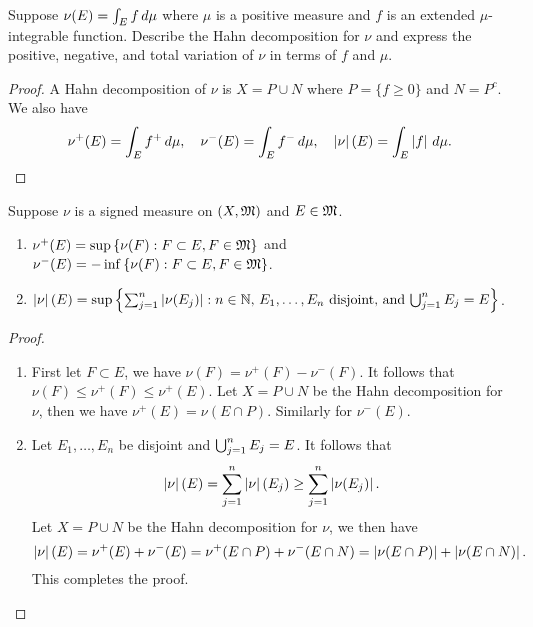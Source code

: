 \documentclass[a4paper]{article}
\begin{document}
\begin{ex}[Folland 3.6]
Suppose $\nu(E) = \int_E f \, d \mu$ where $\mu$ is a positive 
measure and $f$ is an extended $\mu$-integrable function. 
Describe the Hahn decomposition for $\nu$ and express 
the positive, negative, and total variation of $\nu$ 
in terms of $f$ and $\mu$. 
\end{ex}

\begin{proof}
A Hahn decomposition of $\nu$ is $X = P \cup N$ where 
$P = \{f \geq 0\}$ and $N = P^c$. We also have 
\[
\begin{aligned}
  \nu^+ (E) = \int_E f^+ \, d \mu, \quad
  \nu^- (E) = \int_E f^- \, d \mu, \quad
  \left\lvert \nu\right\rvert (E) = \int_E \left\lvert f\right\rvert \, d \mu.
\end{aligned}
\]
\end{proof}

\begin{ex}[Folland 3.7]
Suppose $\nu$ is a signed measure on $(X, \mathfrak{M})$ and $E \in \mathfrak{M}$.
\begin{enumerate}
\item $\nu^+ (E) = \sup \left\{ \nu(F) : F \subset E, F \in \mathfrak{M} 
\right\}$ and $\nu^-(E) = - \inf \left\{ \nu(F) : F \subset E, 
F \in \mathfrak{M} \right\}$. 

\item $\left\lvert \nu\right\rvert(E) = \sup \left\{ \sum_{j=1}^n \left\lvert \nu(E_j)\right\rvert 
: \text{$n \in \mathbb{N}$, $E_1, \dots, E_n$ disjoint, and 
$\bigcup_{j=1}^n E_j = E$} \right\}$.
\end{enumerate}
\end{ex}

\begin{proof}
\begin{enumerate}
\item First let $F \subset E$, we have $\nu(F) = \nu^+(F) - \nu^-(F)$.
It follows that $\nu(F) \leq \nu^+ (F) \leq \nu^+ (E)$. Let 
$X = P \cup N$ be the Hahn decomposition for $\nu$, then we have 
$\nu^+(E) = \nu(E \cap P)$. Similarly for $\nu^- (E)$. 

\item Let $E_1, \dots, E_n$ be disjoint and $\bigcup_{j=1}^n E_j = E$. 
It follows that 
\[
\left\lvert \nu\right\rvert(E) = \sum_{j=1}^n \left\lvert \nu\right\rvert(E_j) \geq \sum_{j=1}^n \left\lvert \nu(E_j)\right\rvert.
\]
Let $X = P \cup N$ be the Hahn decomposition for $\nu$, we 
then have 
\[
\left\lvert \nu\right\rvert(E) = \nu^+ (E) + \nu^-(E) = \nu^+ (E \cap P) 
+ \nu^- (E \cap N) = \left\lvert \nu (E \cap P)\right\rvert + \left\lvert \nu (E \cap N)\right\rvert.
\]
This completes the proof.
\end{enumerate}
\end{proof}
\end{document}

